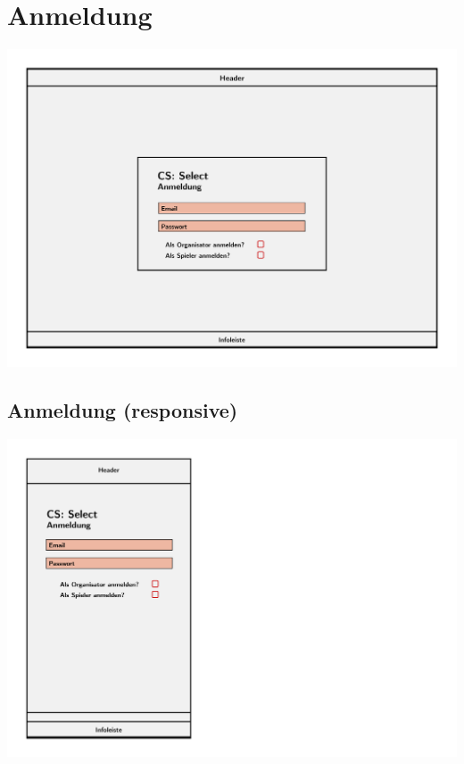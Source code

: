 \documentclass[a4paper]{scrreprt}
\begin{document}
    \section{Anmeldung}
    \centering
    \includegraphics[width=\textwidth]{../pictures/Anmeldung.jpg}
    \subsection{Anmeldung (responsive)}
    \centering
    \includegraphics[width=\textwidth]{../pictures/Anmeldung_responsive.jpg}
\end{document}
